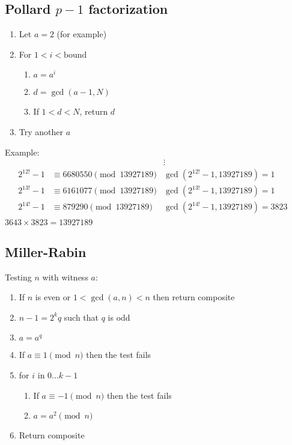 \documentclass{article}
\begin{document}
\subsection*{Pollard $p-1$ factorization}
\begin{enumerate}
    \item Let $a = 2$ (for example)
    \item For $1 < i < \text{bound}$
    \begin{enumerate}
        \item $a = a^i$
        \item $d = \gcd(a - 1, N)$
        \item If $1 < d < N$, return $d$
    \end{enumerate}
    \item Try another $a$
\end{enumerate}

Example:
\begin{align*}
    & &\vdots & \\
    2^{12!} - 1 &\equiv 6680550 \pmod{13927189} & \gcd(2^{12!} - 1, 13927189) = 1 \\
    2^{13!} - 1 &\equiv 6161077 \pmod{13927189} & \gcd(2^{13!} - 1, 13927189) = 1 \\
    2^{14!} - 1 &\equiv 879290  \pmod{13927189} & \gcd(2^{14!} - 1, 13927189) = 3823 \\
\end{align*}
$3643 \times 3823 = 13927189$

\subsection*{Miller-Rabin}
Testing $n$ with witness $a$:
\begin{enumerate}
    \item If $n$ is even or $1 < \gcd(a, n) < n$ then return composite
    \item $n - 1 = 2^k q$ such that $q$ is odd
    \item $a = a^q$
    \item If $a \equiv 1 \pmod{n}$ then the test fails
    \item for $i$ in $0...k-1$
    \begin{enumerate}
        \item If $a \equiv -1 \pmod{n}$ then the test fails
        \item $a = a^2 \pmod{n}$
    \end{enumerate}
    \item Return composite
\end{enumerate}
\end{document}
